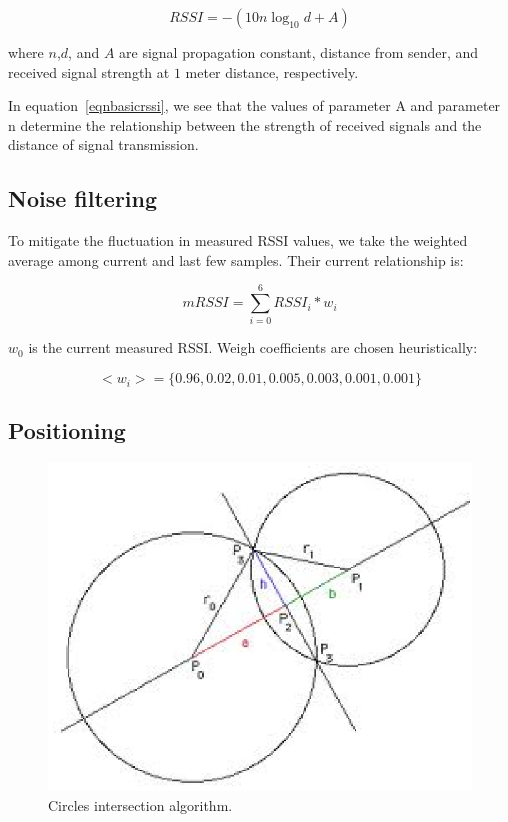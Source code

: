 \documentclass[conference,a4paper]{../../sty/IEEEtran}
\begin{document}
\begin{equation}
  RSSI = -(10n \log_{10}d + A)
 \label{eqnbasicrssi}
\end{equation}

where $n$,$d$, and $A$ are signal propagation constant, distance from sender, and received signal strength at $1$ meter distance, respectively.

In equation~\ref{eqnbasicrssi}, we see that the values of parameter A and parameter n determine the relationship between the strength of received signals and the distance of signal transmission.

\subsection{Noise filtering}

To mitigate the fluctuation in measured RSSI values, we take the weighted average among current and last few samples.
Their current relationship is:

\begin{equation}
mRSSI = \sum_{i=0}^{6} RSSI_i * w_i
\end{equation}

$w_0$ is the current measured RSSI.
Weigh coefficients are chosen heuristically:

\begin{equation}
<w_i> = \{ 0.96, 0.02, 0.01, 0.005, 0.003, 0.001, 0.001 \}
\end{equation}

\subsection{Positioning}

\begin{figure}[h!]
\centering
\includegraphics[scale=0.7]{intr.eps}
\caption{Circles intersection algorithm.\cite{cshint}}
\label{fig2}
\end{figure}
\end{document}
